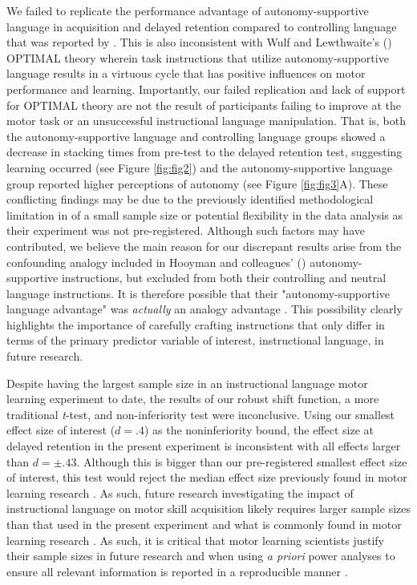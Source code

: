\documentclass[doc,floatsintext,donotrepeattitle,letterpaper,12pt]{apa7}
\begin{document}
We failed to replicate the performance advantage of autonomy-supportive language in acquisition and delayed retention compared to controlling language that was reported by \textcite{hooyman2014}. This is also inconsistent with Wulf and Lewthwaite's (\citeyear{wulf2016}) OPTIMAL theory wherein task instructions that utilize autonomy-supportive language results in a virtuous cycle that has positive influences on motor performance and learning. Importantly, our failed replication and lack of support for OPTIMAL theory are not the result of participants failing to improve at the motor task or an unsuccessful instructional language manipulation. That is, both the autonomy-supportive language and controlling language groups showed a decrease in stacking times from pre-test to the delayed retention test, suggesting learning occurred (see Figure \ref{fig:fig2}) and the autonomy-supportive language group reported higher perceptions of autonomy (see Figure \ref{fig:fig3}A). These conflicting findings may be due to the previously identified methodological limitation in \textcite{hooyman2014} of a small sample size or potential flexibility in the data analysis as their experiment was not pre-registered. Although such factors may have contributed, we believe the main reason for our discrepant results arise from the confounding analogy included in Hooyman and colleagues' (\citeyear{hooyman2014}) autonomy-supportive instructions, but excluded from both their controlling and neutral language instructions. It is therefore possible that their "autonomy-supportive language advantage" was \emph{actually} an analogy advantage \autocite[e.g.,][]{liao2001,masters2020}. This possibility clearly highlights the importance of carefully crafting instructions that only differ in terms of the primary predictor variable of interest, instructional language, in future research.

Despite having the largest sample size in an instructional language motor learning experiment to date, the results of our robust shift function, a more traditional \emph{t}-test, and non-inferiority test were inconclusive. Using our smallest effect size of interest ($d = .4$) as the noninferiority bound, the effect size at delayed retention in the present experiment is inconsistent with all effects larger than $d = \pm.43$. Although this is bigger than our pre-registered smallest effect size of interest, this test would reject the median effect size previously found in motor learning research \autocite[\emph{d} = .63 by][]{lohse2016}. As such, future research investigating the impact of instructional language on motor skill acquisition likely requires larger sample sizes than that used in the present experiment and what is commonly found in motor learning research \autocite[see][for discussions]{lohse2016,mckay2023}. As such, it is critical that motor learning scientists justify their sample sizes in future research \autocite[e.g.,][]{lakens2022,mckay2023a} and when using \emph{a priori} power analyses to ensure all relevant information is reported in a reproducible manner \autocite{mckay2023b}.
\end{document}
